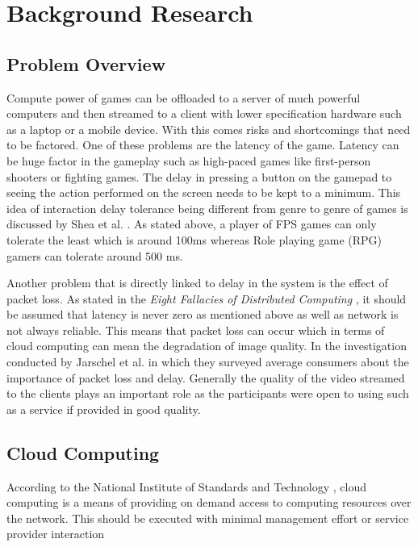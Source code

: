 \chapter{Background Research}
\label{chapter2}

\section{Problem Overview}
Compute power of games can be offloaded to a server of much powerful computers and then streamed to a client with lower specification hardware such as a laptop or a mobile device. With this comes risks and shortcomings that need to be factored. One of these problems are the latency of the game. Latency can be huge factor in the gameplay such as high-paced games like first-person shooters or fighting games. The delay in pressing a button on the gamepad to seeing the action performed on the screen needs to be kept to a minimum. This idea of interaction delay tolerance being different from genre to genre of games is discussed by Shea et al. \cite{shea2013cloud}. As stated above, a player of FPS games can only tolerate the least which is around 100ms whereas Role playing game (RPG) gamers can tolerate around 500 ms.
\newline
\par
Another problem that is directly linked to delay in the system is the effect of packet loss. As stated in the \textit{Eight Fallacies of Distributed Computing} \cite{deutsch1994eight}, it should be assumed that latency is never zero as mentioned above as well as network is not always reliable. This means that packet loss can occur which in terms of cloud computing can mean the degradation of image quality. In the investigation conducted by Jarschel et al. \cite{jarschel2011evaluation} in which they surveyed average consumers about the importance of packet loss and delay. Generally the quality of the video streamed to the clients plays an important role as the participants were open to using such as a service if provided in good quality.

\section{Cloud Computing}
According to the National Institute of Standards and Technology \cite{mell2011nist}, cloud computing is a means of providing on demand access to computing resources over the network. This should be executed with minimal management effort or service provider interaction

